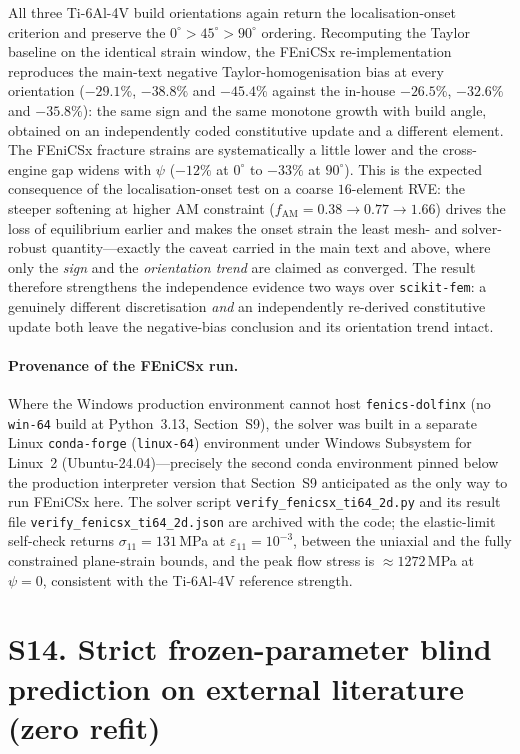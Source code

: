 \documentclass[11pt,a4paper,twocolumn]{article}
\providecommand{\ang}[1]{\ensuremath{#1^{\circ}}}
\begin{document}
All three Ti-6Al-4V build orientations again return the localisation-onset criterion and preserve the
$\ang{0}>\ang{45}>\ang{90}$ ordering. Recomputing the Taylor baseline on the identical strain window, the
FEniCSx re-implementation reproduces the main-text negative Taylor-homogenisation bias at every orientation
($-29.1\%$, $-38.8\%$ and $-45.4\%$ against the in-house $-26.5\%$, $-32.6\%$ and $-35.8\%$): the same sign
and the same monotone growth with build angle, obtained on an independently coded constitutive update and a
different element. The FEniCSx fracture strains are systematically a little lower and the cross-engine gap
widens with $\psi$ ($-12\%$ at $\ang{0}$ to $-33\%$ at $\ang{90}$). This is the expected consequence of the
localisation-onset test on a coarse $16$-element RVE: the steeper softening at higher AM constraint
($f_{\mathrm{AM}} = 0.38\!\to\!0.77\!\to\!1.66$) drives the loss of equilibrium earlier and makes the onset
strain the least mesh- and solver-robust quantity---exactly the caveat carried in the main text and above, where
only the \emph{sign} and the \emph{orientation trend} are claimed as converged. The result therefore strengthens
the independence evidence two ways over \texttt{scikit-fem}: a genuinely different discretisation \emph{and} an
independently re-derived constitutive update both leave the negative-bias conclusion and its orientation trend
intact.

\paragraph{Provenance of the FEniCSx run.} Where the Windows production environment cannot host
\texttt{fenics-dolfinx} (no \texttt{win-64} build at Python~3.13, Section~S9), the solver was built in a
separate Linux \texttt{conda-forge} (\texttt{linux-64}) environment under Windows Subsystem for Linux~2
(Ubuntu-24.04)---precisely the second conda environment pinned below the production interpreter version that
Section~S9 anticipated as the only way to run FEniCSx here. The solver script
\texttt{verify\_fenicsx\_ti64\_2d.py} and its result file \texttt{verify\_fenicsx\_ti64\_2d.json} are
archived with the code; the elastic-limit self-check returns $\sigma_{11} = 131$\,MPa at
$\varepsilon_{11} = 10^{-3}$, between the uniaxial and the fully constrained plane-strain bounds, and the
peak flow stress is $\approx 1272$\,MPa at $\psi=0$, consistent with the Ti-6Al-4V reference strength.

\section*{S14. Strict frozen-parameter blind prediction on external literature (zero refit)}
\end{document}
